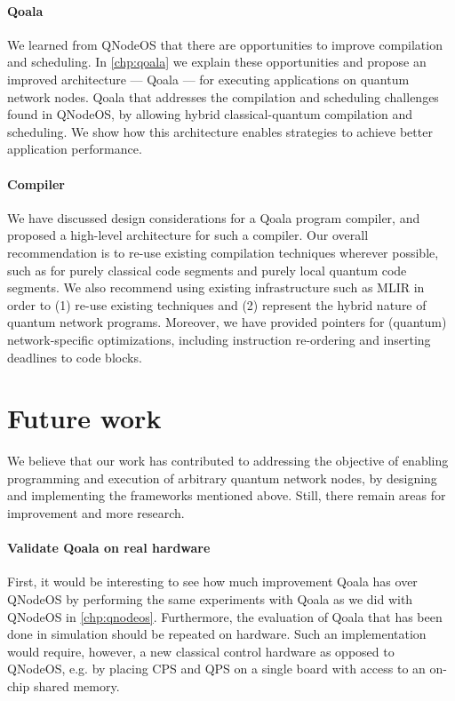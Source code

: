 \paragraph{Qoala}
We learned from \ac{QNodeOS} that there are opportunities to improve compilation and scheduling.
In \cref{chp:qoala} we explain these opportunities and propose an improved architecture --- Qoala --- for executing applications on quantum network nodes.
Qoala that addresses the compilation and scheduling challenges found in QNodeOS, by allowing hybrid classical-quantum compilation and scheduling.
We show how this architecture enables strategies to achieve better application performance.

\paragraph{Compiler}
We have discussed design considerations for a Qoala program compiler, and proposed a high-level architecture for such a compiler.
Our overall recommendation is to re-use existing compilation techniques wherever possible, such as for purely classical code segments and purely local quantum code segments.
We also recommend using existing infrastructure such as MLIR in order to (1) re-use existing techniques and (2) represent the hybrid nature of quantum network programs.
Moreover, we have provided pointers for (quantum) network-specific optimizations, including instruction re-ordering and inserting deadlines to code blocks.




\section{Future work}
We believe that our work has contributed to addressing the objective of enabling programming and execution of arbitrary quantum network nodes, by designing and implementing the frameworks mentioned above.
Still, there remain areas for improvement and more research.

\paragraph{Validate Qoala on real hardware}
First, it would be interesting to see how much improvement Qoala has over \ac{QNodeOS} by performing the same experiments with Qoala as we did with QNodeOS in \cref{chp:qnodeos}.
Furthermore, the evaluation of Qoala that has been done in simulation should be repeated on hardware.
Such an implementation would require, however, a new classical control hardware as opposed to QNodeOS, e.g. by placing CPS and QPS on a single board with access to an on-chip shared memory. 


